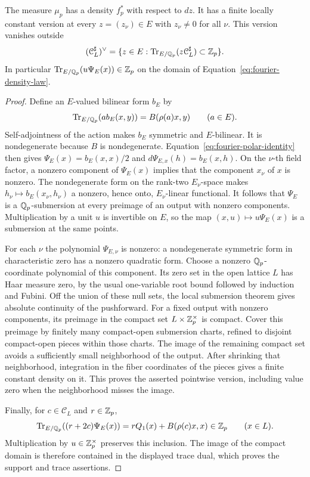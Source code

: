 \begin{lemma}\label{lem:fourier-density}
The measure $\mu_p$ has a density $f_p^*$ with respect to $dz$.  It has a
finite locally constant version at every $z=(z_\nu)\in E$ with
$z_\nu\ne0$ for all $\nu$.  This version vanishes outside
\[
 (\mathcal C_L^\sharp)^\vee
 =\{z\in E:\operatorname{Tr}_{E/\mathbb Q_p}(z\mathcal C_L^\sharp)\subset\mathbb Z_p\}.
\]
In particular $\operatorname{Tr}_{E/\mathbb Q_p}(u\Psi_E(x))\in\mathbb Z_p$ on the domain of
Equation~\eqref{eq:fourier-density-law}.
\end{lemma}

\begin{proof}
Define an $E$-valued bilinear form $b_E$ by
\[
 \operatorname{Tr}_{E/\mathbb Q_p}(a b_E(x,y))=B(\rho(a)x,y)\qquad(a\in E).
\]
Self-adjointness of the action makes $b_E$ symmetric and $E$-bilinear.
It is nondegenerate because $B$ is nondegenerate.  Equation~\eqref{eq:fourier-polar-identity}
then gives $\Psi_E(x)=b_E(x,x)/2$ and
$d\Psi_{E,x}(h)=b_E(x,h)$.  On the $\nu$-th field factor, a nonzero
component of $\Psi_E(x)$ implies that the component $x_\nu$ of $x$ is
nonzero.  The nondegenerate form on the rank-two $E_\nu$-space makes
$h_\nu\mapsto b_E(x_\nu,h_\nu)$ a nonzero, hence onto, $E_\nu$-linear
functional.  It follows that $\Psi_E$ is a $\mathbb Q_p$-submersion at every
preimage of an output with nonzero components.  Multiplication by a unit
$u$ is invertible on $E$, so the map $(x,u)\mapsto u\Psi_E(x)$ is a
submersion at the same points.

For each $\nu$ the polynomial $\Psi_{E,\nu}$ is nonzero: a nondegenerate
symmetric form in characteristic zero has a nonzero quadratic form.  Choose
a nonzero $\mathbb Q_p$-coordinate polynomial of this component.  Its zero set in
the open lattice $L$ has Haar measure zero, by the usual one-variable root
bound followed by induction and Fubini.  Off the union of
these null sets, the local submersion theorem gives absolute continuity of
the pushforward.  For a fixed output with nonzero components, its preimage
in the compact set $L\times\mathbb Z_p^\times$ is compact.  Cover this preimage
by finitely many compact-open submersion charts, refined to disjoint
compact-open pieces within those charts.  The image of the remaining compact
set avoids a sufficiently small neighborhood of the output.  After shrinking
that neighborhood, integration in the fiber coordinates of the pieces gives
a finite constant density on it.  This proves the asserted
pointwise version, including value zero when the neighborhood misses the
image.

Finally, for $c\in\mathcal C_L$ and $r\in\mathbb Z_p$,
\[
 \operatorname{Tr}_{E/\mathbb Q_p}((r+2c)\Psi_E(x))
       =rQ_1(x)+B(\rho(c)x,x)\in\mathbb Z_p\qquad(x\in L).
\]
Multiplication by $u\in\mathbb Z_p^\times$ preserves this inclusion.  The image
of the compact domain is therefore contained in the displayed trace dual,
which proves the support and trace assertions.
\end{proof}

